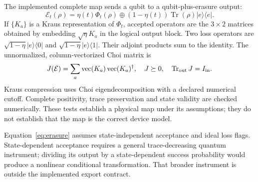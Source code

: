 \documentclass[11pt,a4paper]{article}
\newcommand{\Tr}{\operatorname{Tr}}
\newcommand{\E}{\mathcal E}
\newcommand{\ket}[1]{\lvert #1\rangle}
\newcommand{\bra}[1]{\langle #1\rvert}
\begin{document}
The implemented complete map sends a qubit to a qubit-plus-erasure output:
\begin{equation}
\E_t(\rho)=\eta(t)\Phi_t(\rho)\oplus
(1-\eta(t))\Tr(\rho)\ket e\bra e.
\label{eq:erasure}
\end{equation}
If $\{K_a\}$ is a Kraus representation of $\Phi_t$, accepted operators are the $3\times2$ matrices obtained by embedding $\sqrt\eta K_a$ in the logical output block. Two loss operators are $\sqrt{1-\eta}\ket e\bra0$ and $\sqrt{1-\eta}\ket e\bra1$. Their adjoint products sum to the identity. The unnormalized, column-vectorized Choi matrix is
\begin{equation}
J(\E)=\sum_a\operatorname{vec}(K_a)\operatorname{vec}(K_a)^\dagger,
\quad J\succeq0,\quad\Tr_{\rm out}J=I_{
\rm in}.
\end{equation}
Kraus compression uses Choi eigendecomposition with a declared numerical cutoff. Complete positivity, trace preservation and state validity are checked numerically. These tests establish a physical map under its assumptions; they do not establish that the map is the correct device model.

Equation~\eqref{eq:erasure} assumes state-independent acceptance and ideal loss flags. State-dependent acceptance requires a general trace-decreasing quantum instrument; dividing its output by a state-dependent success probability would produce a nonlinear conditional transformation. That broader instrument is outside the implemented export contract.
\end{document}
